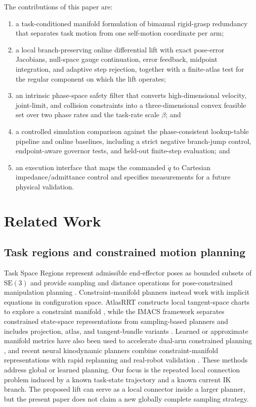 \documentclass[preprint,12pt]{elsarticle}
\newcommand{\SE}{\mathrm{SE}(3)}
\begin{document}
The contributions of this paper are:
\begin{enumerate}
    \item a task-conditioned manifold formulation of bimanual rigid-grasp redundancy that separates task motion from one self-motion coordinate per arm;
    \item a local branch-preserving online differential lift with exact pose-error Jacobians, null-space gauge continuation, error feedback, midpoint integration, and adaptive step rejection, together with a finite-atlas test for the regular component on which the lift operates;
    \item an intrinsic phase-space safety filter that converts high-dimensional velocity, joint-limit, and collision constraints into a three-dimensional convex feasible set over two phase rates and the task-rate scale $\beta$; and
    \item a controlled simulation comparison against the phase-consistent lookup-table pipeline and online baselines, including a strict negative branch-jump control, endpoint-aware governor tests, and held-out finite-step evaluation; and
    \item an execution interface that maps the commanded $\dot q$ to Cartesian impedance/admittance control and specifies measurements for a future physical validation.
\end{enumerate}

\section{Related Work}
\label{sec:related}

\subsection{Task regions and constrained motion planning}

Task Space Regions represent admissible end-effector poses as bounded subsets of $\SE$ and provide sampling and distance operations for pose-constrained manipulation planning \cite{berenson2011}. Constraint-manifold planners instead work with implicit equations in configuration space. AtlasRRT constructs local tangent-space charts to explore a constraint manifold \cite{jaillet2013}, while the IMACS framework separates constrained state-space representations from sampling-based planners and includes projection, atlas, and tangent-bundle variants \cite{kingston2019}. Learned or approximate manifold metrics have also been used to accelerate dual-arm constrained planning \cite{wang2018metric}, and recent neural kinodynamic planners combine constraint-manifold representations with rapid replanning and real-robot validation \cite{kicki2023cnpb}. These methods address global or learned planning. Our focus is the repeated local connection problem induced by a known task-state trajectory and a known current IK branch. The proposed lift can serve as a local connector inside a larger planner, but the present paper does not claim a new globally complete sampling strategy.
\end{document}
